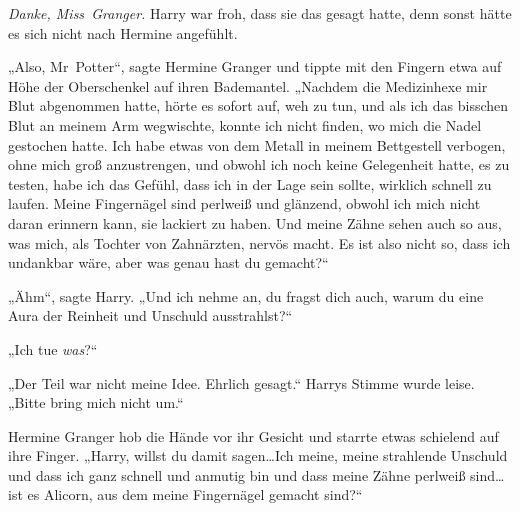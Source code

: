 \emph{Danke, Miss~Granger.}
Harry war froh, dass sie das gesagt hatte, denn sonst hätte es sich nicht nach Hermine angefühlt.

„Also, Mr~Potter“, sagte Hermine Granger und tippte mit den Fingern etwa auf Höhe der Oberschenkel auf ihren Bademantel. „Nachdem die Medizinhexe mir Blut abgenommen hatte, hörte es sofort auf, weh zu tun, und als ich das bisschen Blut an meinem Arm wegwischte, konnte ich nicht finden, wo mich die Nadel gestochen hatte. Ich habe etwas von dem Metall in meinem Bettgestell verbogen, ohne mich groß anzustrengen, und obwohl ich noch keine Gelegenheit hatte, es zu testen, habe ich das Gefühl, dass ich in der Lage sein sollte, wirklich schnell zu laufen. Meine Fingernägel sind perlweiß und glänzend, obwohl ich mich nicht daran erinnern kann, sie lackiert zu haben. Und meine Zähne sehen auch so aus, was mich, als Tochter von Zahnärzten, nervös macht. Es ist also nicht so, dass ich undankbar wäre, aber was genau hast du gemacht?“

„Ähm“, sagte Harry. „Und ich nehme an, du fragst dich auch, warum du eine Aura der Reinheit und Unschuld ausstrahlst?“

„Ich tue \emph{was}?“

„Der Teil war nicht meine Idee. Ehrlich gesagt.“ Harrys Stimme wurde leise. „Bitte bring mich nicht um.“

Hermine Granger hob die Hände vor ihr Gesicht und starrte etwas schielend auf ihre Finger. „Harry, willst du damit sagen…Ich meine, meine strahlende Unschuld und dass ich ganz schnell und anmutig bin und dass meine Zähne perlweiß sind…ist es Alicorn, aus dem meine Fingernägel gemacht sind?“

